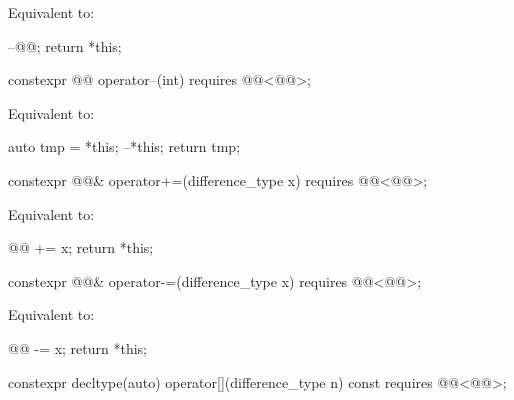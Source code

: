 \begin{itemdescr}
\pnum
\effects
Equivalent to:
\begin{codeblock}
--@@;
return *this;
\end{codeblock}
\end{itemdescr}

%
\begin{itemdecl}
constexpr @@ operator--(int) requires @@<@@>;
\end{itemdecl}

\begin{itemdescr}
\pnum
\effects
Equivalent to:
\begin{codeblock}
auto tmp = *this;
--*this;
return tmp;
\end{codeblock}
\end{itemdescr}

%
\begin{itemdecl}
constexpr @@& operator+=(difference_type x) requires @@<@@>;
\end{itemdecl}

\begin{itemdescr}
\pnum
\effects
Equivalent to:
\begin{codeblock}
@@ += x;
return *this;
\end{codeblock}
\end{itemdescr}

%
\begin{itemdecl}
constexpr @@& operator-=(difference_type x) requires @@<@@>;
\end{itemdecl}

\begin{itemdescr}
\pnum
\effects
Equivalent to:
\begin{codeblock}
@@ -= x;
return *this;
\end{codeblock}
\end{itemdescr}

%
\begin{itemdecl}
constexpr decltype(auto) operator[](difference_type n) const
  requires @@<@@>;
\end{itemdecl}


